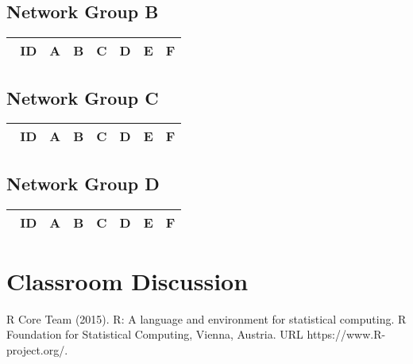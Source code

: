\documentclass[preprint, 8pt]{elsarticle}
\theoremstyle{definition}
\begin{document}
\subsection{Network Group B}

\begin{table}[H]\centering
\begin{tabular}{p{1cm}p{1cm}p{1cm}p{1cm}p{1cm}p{1cm}p{4cm}}\
ID & A & B & C & D & E & F \\
\hline
\hline
\end{tabular}
\end{table}

\subsection{Network Group C}

\begin{table}[H]\centering
\begin{tabular}{p{1cm}p{1cm}p{1cm}p{1cm}p{1cm}p{1cm}p{4cm}}\
ID & A & B & C & D & E & F \\
\hline
\hline
\end{tabular}
\end{table}

\subsection{Network Group D}

\begin{table}[H]\centering
\begin{tabular}{p{1cm}p{1cm}p{1cm}p{1cm}p{1cm}p{1cm}p{4cm}}\
ID & A & B & C & D & E & F \\
\hline
\hline
\end{tabular}
\end{table}

\section{Classroom Discussion}


\begin{thebibliography}{00}
	\footnotesize		 		
	R Core Team (2015). 
	\newblock R: A language and environment for statistical computing. R Foundation for Statistical Computing, Vienna, Austria.
	\newblock URL https://www.R-project.org/.		
\end{thebibliography}
\end{document}
